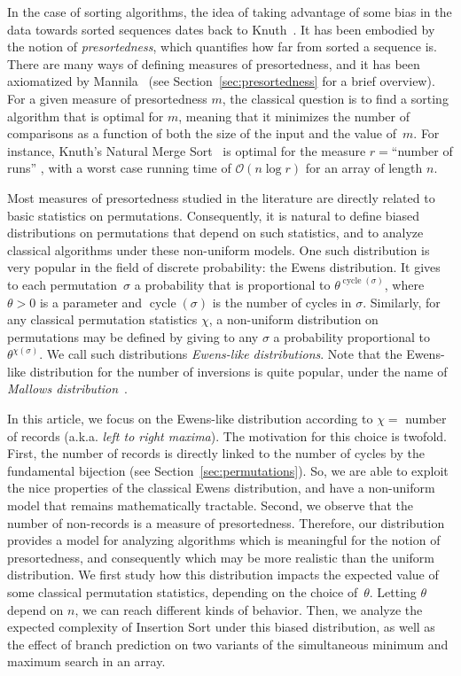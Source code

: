 \documentclass[proceedings]{aofa}
\renewcommand{\O}{\mathcal{O}}
\DeclareMathOperator{\cyc}{cycle}
\begin{document}
In the case of sorting algorithms, the idea of taking advantage of some bias in the data towards sorted sequences dates back to Knuth~\cite[p. 336]{Knuth98}. 
It has been embodied by the notion of \emph{presortedness}, which quantifies how far from sorted a sequence is. 
There are many ways of defining measures of presortedness, and it has been axiomatized by Mannila~\cite{Mannila1985} (see Section~\ref{sec:presortedness} for a brief overview). 
For a given measure of presortedness $m$, the classical question is to find a sorting algorithm that is optimal for $m$, meaning that it minimizes the number of comparisons as a function of both the size of the input and the value of~$m$. 
For instance, Knuth's Natural Merge Sort~\cite{Knuth98} is optimal for the measure $r=$``number of runs'' , with a worst case running time of $\O(n\log r)$ for an array of length $n$. 

Most measures of presortedness studied in the literature are directly related to basic statistics on permutations. 
Consequently, it is natural to define biased distributions on permutations that depend on such statistics, 
and to analyze classical algorithms under these non-uniform models. 
One such distribution is very popular in the field of discrete probability: the Ewens distribution. 
It gives to each permutation~$\sigma$ a probability that is proportional to $\theta^{\cyc(\sigma)}$,
where $\theta>0$ is a parameter and $\cyc(\sigma)$ is the number of cycles in $\sigma$. 
Similarly, for any classical permutation statistics $\chi$, 
a non-uniform distribution on permutations may be defined by giving to any $\sigma$ a probability proportional to $\theta^{\chi(\sigma)}$. 
We call such distributions \emph{Ewens-like distributions}. 
Note that the Ewens-like distribution for the number of inversions is quite popular, under the name of \emph{Mallows distribution}~\cite[and references therein]{Gladkich}. 
 


In this article, we focus on the Ewens-like distribution according to $\chi=$ number of records (a.k.a. \emph{left to right maxima}). 
The motivation for this choice is twofold. 
First, the number of records is directly linked to the number of cycles by the fundamental bijection (see Section~\ref{sec:permutations}). 
So, we are able to exploit the nice properties of the classical Ewens distribution, and have a non-uniform model that remains mathematically tractable. 
Second, we observe that the number of non-records is a measure of presortedness. 
Therefore, our distribution provides a model for analyzing algorithms which is meaningful for the notion of presortedness, 
and consequently which may be more realistic than the uniform distribution. 
We first study how this distribution impacts the expected value of some classical permutation statistics, depending on the choice of~$\theta$. 
Letting $\theta$ depend on $n$, we can reach different kinds of behavior. 
Then, we analyze the expected complexity of Insertion Sort under this biased distribution, 
as well as the effect of branch prediction on two variants of the simultaneous minimum and maximum search in an array.
\end{document}
